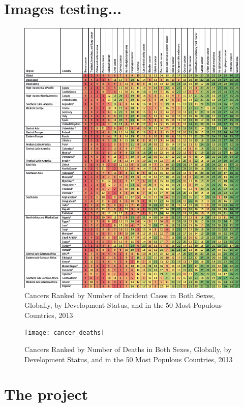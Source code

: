 \documentclass[UKenglish,11pt,a4paper]{article}
\begin{document}

\part{Images testing...}
\begin{figure}[h]
    \caption{Cancers Ranked by Number of Incident Cases in Both Sexes, Globally, by Development Status, and in the 50
            Most Populous Countries, 2013}
    \includegraphics{cancer_incidents}
\end{figure}

\begin{figure}[h]
    \caption{Cancers Ranked by Number of Deaths in Both Sexes, Globally, by Development Status, and in the 50 Most
            Populous Countries, 2013}
    \texttt{[image: cancer\_deaths]}
\end{figure}

\part{The project}
\end{document}
